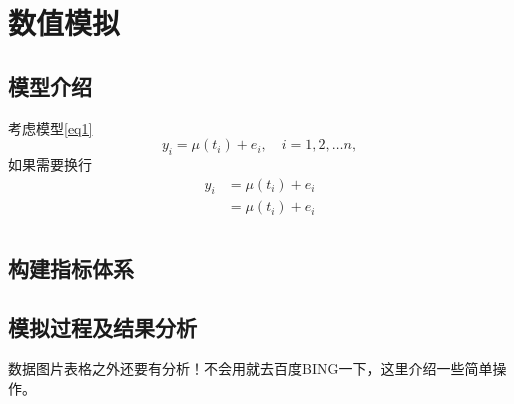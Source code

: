\documentclass{SUFEThesis}
\begin{document}
\section{数值模拟}
\subsection{模型介绍}
考虑模型\eqref{eq1}
\begin{equation}
y_i = \mu(t_i) + e_i, \quad i = 1,2,\dots n,
\label{eq1}
\end{equation}
如果需要换行
\begin{equation}
  \begin{aligned}
  y_i &= \mu(t_i) + e_i\\
      &= \mu(t_i) + e_i\\
  \end{aligned}
\end{equation}


\subsection{构建指标体系}


\subsection{模拟过程及结果分析}
数据图片表格之外还要有分析！不会用就去百度BING一下，这里介绍一些简单操作。
\end{document}
